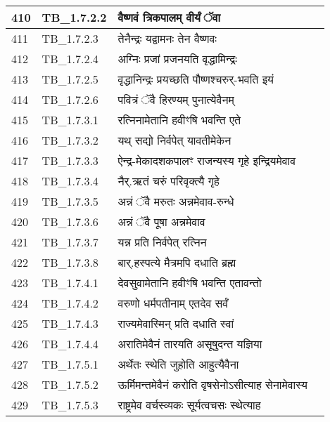 \documentclass[17pt]{extarticle}
\begin{document}
\begin{longtable}{||p{0.4in}||p{0.9in}||p{4.0in}||p{0.9in}||}
        \hline
            410 & TB\_1.7.2.2 & वैष्णवं त्रिकपालम् वीर्यं ॅवा &      \\
        \hline
            411 & TB\_1.7.2.3 & तेनैन्द्रः यद्वामनः तेन वैष्णवः &      \\
        \hline
            412 & TB\_1.7.2.4 & अग्निः प्रजां प्रजनयति वृद्धामिन्द्रः &      \\
        \hline
            413 & TB\_1.7.2.5 & वृद्धानिन्द्रः प्रयच्छति पौष्णश्चरुर्{-}भवति इयं &      \\
        \hline
            414 & TB\_1.7.2.6 & पवित्रं ॅवै हिरण्यम् पुनात्येवैनम् &      \\
        \hline
            415 & TB\_1.7.3.1 & रत्निनामेतानि हवीꣳषि भवन्ति एते &      \\
        \hline
            416 & TB\_1.7.3.2 & यथ् सद्यो निर्वपेत् यावतीमेकेन &      \\
        \hline
            417 & TB\_1.7.3.3 & ऐन्द्र{-}मेकादशकपालꣳ राजन्यस्य गृहे इन्द्रियमेवाव &      \\
        \hline
            418 & TB\_1.7.3.4 & नैर्.ऋतं चरुं परिवृक्त्यै गृहे &      \\
        \hline
            419 & TB\_1.7.3.5 & अन्नं ॅवै मरुतः अन्नमेवाव{-}रुन्धे &      \\
        \hline
            420 & TB\_1.7.3.6 & अन्नं ॅवै पूषा अन्नमेवाव &      \\
        \hline
            421 & TB\_1.7.3.7 & यन्न प्रति निर्वपेत् रत्निन &      \\
        \hline
            422 & TB\_1.7.3.8 & बार्.हस्पत्ये मैत्रमपि दधाति ब्रह्म &      \\
        \hline
            423 & TB\_1.7.4.1 & देवसुवामेतानि हवीꣳषि भवन्ति एतावन्तो &      \\
        \hline
            424 & TB\_1.7.4.2 & वरुणो धर्मपतीनाम् एतदेव सर्वं &      \\
        \hline
            425 & TB\_1.7.4.3 & राज्यमेवास्मिन् प्रति दधाति स्वां &      \\
        \hline
            426 & TB\_1.7.4.4 & अरातिमेवैनं तारयति असूषुदन्त यज्ञिया &      \\
        \hline
            427 & TB\_1.7.5.1 & अर्थेतः स्थेति जुहोति आहुत्यैवैना &      \\
        \hline
            428 & TB\_1.7.5.2 & ऊर्मिमन्तमेवैनं करोति वृषसेनोऽसीत्याह सेनामेवास्य &      \\
        \hline
            429 & TB\_1.7.5.3 & राष्ट्रमेव वर्चस्व्यकः सूर्यत्वचसः स्थेत्याह &      \\

\end{longtable}
\end{document}
